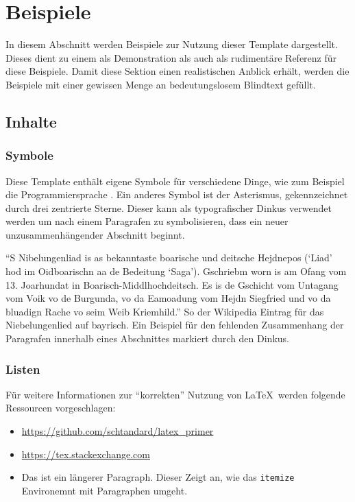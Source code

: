 \chapter{Beispiele}

In diesem Abschnitt werden Beispiele zur Nutzung dieser Template dargestellt.
Dieses dient zu einem als Demonstration als auch als rudimentäre Referenz für diese Beispiele.
Damit diese Sektion einen realistischen Anblick erhält, werden die Beispiele mit einer gewissen Menge an bedeutungslosem Blindtext gefüllt.

\section{Inhalte}

\subsection{Symbole}

Diese Template enthält eigene Symbole für verschiedene Dinge, wie zum Beispiel die Programmiersprache \cpp.
Ein anderes Symbol ist der Asterismus, gekennzeichnet durch drei zentrierte Sterne.
Dieser kann als typografischer Dinkus verwendet werden um nach einem Paragrafen zu symbolisieren, dass ein neuer unzusammenhängender Abschnitt beginnt.

\threeast

\enquote{S Nibelungenliad is as bekanntaste boarische und deitsche Hejdnepos (\enquote{Liad} hod im Oidboarischn aa de Bedeitung \enquote{Saga}). Gschriebm worn is am Ofang vom 13. Joarhundat in Boarisch-Middlhochdeitsch.
Es is de Gschicht vom Untagang vom Voik vo de Burgunda, vo da Eamoadung vom Hejdn Siegfried und vo da bluadign Rache vo seim Weib Kriemhild.}
So der Wikipedia Eintrag für das Niebelungenlied auf bayrisch.
Ein Beispiel für den fehlenden Zusammenhang der Paragrafen innerhalb eines Abschnittes markiert durch den Dinkus.

\subsection{Listen}

Für weitere Informationen zur \enquote{korrekten} Nutzung von \LaTeX\ werden folgende Ressourcen vorgeschlagen:

\begin{itemize}
    \item \url{https://github.com/schtandard/latex_primer}
    \item \url{https://tex.stackexchange.com}
    \item Das ist ein längerer Paragraph.
    Dieser Zeigt an, wie das \texttt{itemize} Environemnt mit Paragraphen umgeht.
\end{itemize}

